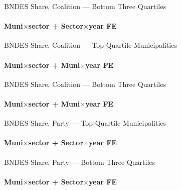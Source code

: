 \documentclass[aspectratio=169,10pt]{beamer}
\newcommand{\tbndes}{../tables/agg_firm_bndes_sector}
\begin{document}
\begin{frame}[t,shrink=5]{BNDES Share, Coalition --- Bottom Three Quartiles}
\framesubtitle{Muni$\times$sector + Sector$\times$year FE}
\begin{center}\footnotesize

\end{center}
\end{frame}

\begin{frame}[t,shrink=5]{BNDES Share, Coalition --- Top-Quartile Municipalities}
\framesubtitle{Muni$\times$sector + Muni$\times$year FE}
\begin{center}\footnotesize

\end{center}
\end{frame}

\begin{frame}[t,shrink=5]{BNDES Share, Coalition --- Bottom Three Quartiles}
\framesubtitle{Muni$\times$sector + Muni$\times$year FE}
\begin{center}\footnotesize

\end{center}
\end{frame}


\begin{frame}[t,shrink=5]{BNDES Share, Party --- Top-Quartile Municipalities}
\framesubtitle{Muni$\times$sector + Sector$\times$year FE}
\begin{center}\footnotesize

\end{center}
\end{frame}

\begin{frame}[t,shrink=5]{BNDES Share, Party --- Bottom Three Quartiles}
\framesubtitle{Muni$\times$sector + Sector$\times$year FE}
\begin{center}\footnotesize

\end{center}
\end{frame}
\end{document}
